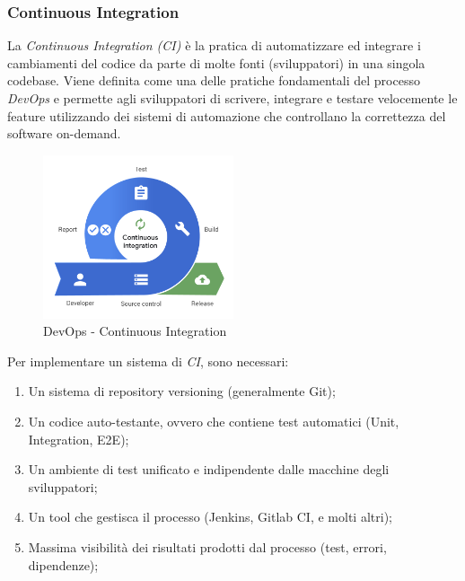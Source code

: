 \documentclass[a4paper,12pt]{report}
\begin{document}
				\subsubsection{Continuous Integration}
				
					La \emph{Continuous Integration (CI)} è la pratica di automatizzare ed integrare i cambiamenti del codice da parte di molte fonti (sviluppatori) in una singola codebase. Viene definita come una delle pratiche fondamentali del processo \emph{DevOps} e permette agli sviluppatori di scrivere, integrare e testare velocemente le feature utilizzando dei sistemi di automazione che controllano la correttezza del software on-demand.
					
					\begin{figure}[h]
						\centering
						\includegraphics[width=0.5\textwidth]{devops_ci}
						\caption{DevOps - Continuous Integration}
						\label{fig:devops_ci}
					\end{figure}
					
					Per implementare un sistema di \emph{CI}, sono necessari:
					\begin{enumerate}
						\item Un sistema di repository versioning (generalmente Git);
						\item Un codice auto-testante, ovvero che contiene test automatici (Unit, Integration, E2E);
						\item Un ambiente di test unificato e indipendente dalle macchine degli sviluppatori;
						\item Un tool che gestisca il processo (Jenkins, Gitlab CI, e molti altri);
						\item Massima visibilità dei risultati prodotti dal processo (test, errori, dipendenze);
					\end{enumerate}
					
\end{document}
